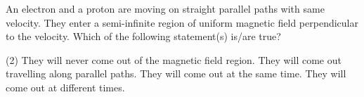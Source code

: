 
\item An electron and a proton are moving on straight parallel paths with same velocity. They enter a semi-infinite region of uniform magnetic field perpendicular to the velocity. Which of the following statement(s) is/are true?
    \begin{tasks}(2)
        \task They will never come out of the magnetic field region.
        \task They will come out travelling along parallel paths.
        \task They will come out at the same time.
        \task They will come out at different times.
    \end{tasks}
